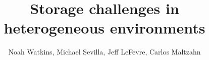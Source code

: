 \documentclass{sig-alternate}
\begin{document}

\toappear{}




%

\title{Storage challenges in heterogeneous environments}

%
%
%
%
%

%
\author{
%
%
\alignauthor
Noah Watkins, Michael Sevilla, Jeff LeFevre, Carlos Maltzahn \\
 \\
}
\end{document}
